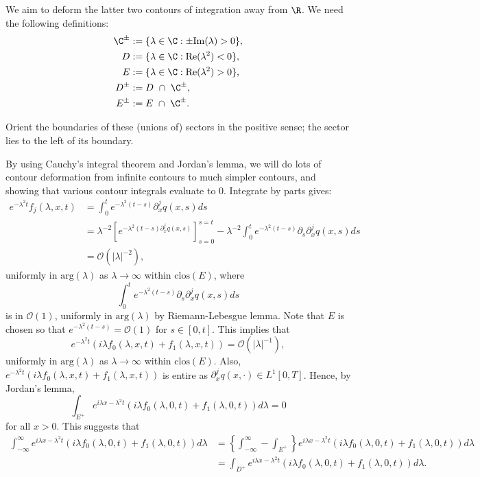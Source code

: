 We aim to deform the latter two contours of integration away from $\R$. We need the following definitions:
\begin{align*}
    \C^\pm &:= \{\lambda \in \C: \pm \mathrm{Im}(\lambda)>0\},\\
    D &:= \{\lambda \in \C: \mathrm{Re}(\lambda^2) < 0\}, \\
    E &:= \{\lambda \in \C: \mathrm{Re}(\lambda^2) > 0\},\\
    D^\pm & := D~\cap~\C^\pm,\\
    E^\pm & := E~\cap~\C^\pm.
\end{align*}

Orient the boundaries of these (unions of) sectors in the positive sense; the sector lies to the left of its boundary.

By using Cauchy's integral theorem and Jordan's lemma, we will do lots of contour deformation from infinite contours to much simpler contours, and showing that various contour integrals evaluate to 0. Integrate by parts gives:
\begin{align*}
    e^{-\lambda^2t}f_j(\lambda,x,t) &= \int_0^t e^{-\lambda^2(t-s)}\partial_x^j q(x,s)ds\\
    &= \lambda^{-2}\left[e^{-\lambda^2(t-s)\partial_x^jq(x,s)}\right]_{s=0}^{s=t} - \lambda^{-2}\int_0^te^{-\lambda^2(t-s)}\partial_s\partial_x^jq(x,s)ds\\
    &= \mathcal{O}(|\lambda|^{-2}),
\end{align*}
uniformly in $\mathrm{arg}(\lambda)$ as $\lambda \to \infty$ within $\mathrm{clos}(E)$, where
\[\int_0^te^{-\lambda^2(t-s)}\partial_s\partial_x^jq(x,s)ds\] is in $\mathcal{O}(1)$, uniformly in  $\mathrm{arg}(\lambda)$ by Riemann-Lebesgue lemma. Note that $E$ is chosen so that $e^{-\lambda^2(t-s)} = \mathcal{O}(1)$ for $s\in[0,t]$. This implies that
\[e^{-\lambda^2t}\left(i\lambda f_0(\lambda,x,t)+f_1(\lambda,x,t)\right) = \mathcal{O}(|\lambda|^{-1}),\]
uniformly in $\mathrm{arg}(\lambda)$ as $\lambda \to \infty$ within $\mathrm{clos}(E)$. Also, $e^{-\lambda^2t}\left(i\lambda f_0(\lambda,x,t)+f_1(\lambda,x,t)\right)$ is entire as $\partial_x^j q(x,\cdot) \in L^1[0,T]$. Hence, by Jordan's lemma, 
\[\int_{E^+} e^{i\lambda x - \lambda^2t} \left(i\lambda f_0(\lambda,0,t) + f_1(\lambda,0,t)\right)d\lambda = 0\]
for all $x > 0$. This suggests that
\begin{align*}
    \int_{-\infty}^\infty e^{i\lambda x - \lambda^2t} \left(i\lambda f_0(\lambda,0,t) + f_1(\lambda,0,t)\right)d\lambda &= \left\{\int_{-\infty}^\infty - \int_{E^+} \right\}e^{i\lambda x - \lambda^2t} \left(i\lambda f_0(\lambda,0,t) + f_1(\lambda,0,t)\right)d\lambda\\
    &= \int_{D^+} e^{i\lambda x - \lambda^2t} \left(i\lambda f_0(\lambda,0,t) + f_1(\lambda,0,t)\right)d\lambda.
\end{align*}
